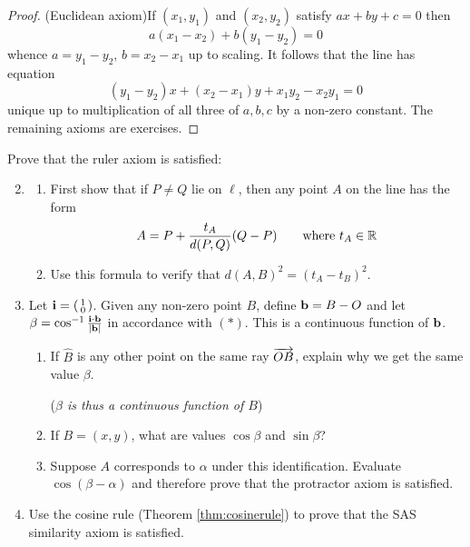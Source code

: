 \begin{proof}
	(Euclidean axiom)\quad If $(x_1,y_1)$ and $(x_2,y_2)$ satisfy $ax+by+c=0$ then
	\[
		a(x_1-x_2)+b(y_1-y_2)=0
	\]
	whence $a=y_1-y_2$, $b=x_2-x_1$ up to scaling. It follows that the line has equation
	\[
		(y_1-y_2)x+(x_2-x_1)y+x_1y_2-x_2y_1=0
	\]
	unique up to multiplication of all three of $a,b,c$ by a non-zero constant.\smallbreak
	The remaining axioms are exercises.
\end{proof}


\begin{exercises}
	\exstart Prove that the ruler axiom is satisfied:
	\begin{enumerate}\setcounter{enumi}{1}
	  \item[]\begin{enumerate}
	    \item First show that if $P\neq Q$ lie on $\ell$, then any point $A$ on the line has the form
			\[
				A=P+\frac{t_A}{d(P,Q)}(Q-P)
				\qquad\text{where }
				t_A\in\mathbb{R}
			\]
			\item Use this formula to verify that $d(A,B)^2=(t_A-t_B)^2$.
		\end{enumerate}
		
		\item Let ${\mathbf{i}}=\left(\begin{smallmatrix}1\\0\end{smallmatrix}\right)$. Given any non-zero point $B$, define ${\mathbf{b}}=B-O$ and let $\beta=\cos^{-1}\frac{{\mathbf{i}}\cdot{\mathbf{b}}}{\left| {\mathbf{b}}\right|}$ in accordance with $(\ast)$. This is a continuous function of ${\mathbf{b}}$.
		\begin{enumerate}
		  \item If $\hat B$ is any other point on the same ray $\overrightarrow{OB}$, explain why we get the same value $\beta$.\par
		  (\emph{$\beta$ is thus a continuous function of $B$})
		  \item If $B=(x,y)$, what are values $\cos\beta$ and $\sin\beta$?
		  \item	Suppose $A$ corresponds to $\alpha$ under this identification. Evaluate $\cos(\beta-\alpha)$ and therefore prove that the protractor axiom is satisfied.
		\end{enumerate}
		
		\item Use the cosine rule (Theorem \ref{thm:cosinerule}) to prove that the SAS similarity axiom is satisfied.
	\end{enumerate}
\end{exercises}

